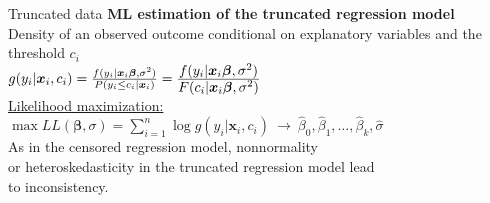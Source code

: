 \documentclass[usenames,dvipsnames]{beamer}
\newcommand{\mytikzmark}[2]{%
  \tikz[remember picture,inner sep=0pt,outer sep=0pt,baseline,anchor=base] 
    \node (#1) {\ensuremath{#2}};}
\begin{document}
\begin{frame}{Truncated data}
\textbf{ML estimation of the truncated regression model} \\
\bigskip
Density of an observed outcome conditional on explanatory variables and the threshold $c_i$ \\
\bigskip
$g(y_i|\bm{x}_i, c_i) = \frac{f(y_i|\bm{x}_i \bm{\beta}, \sigma^2)}{P(y_i \le c_i|\bm{x}_i)} = \frac{\mytikzmark{1}{f(y_i|\bm{x}_i \bm{\beta}, \sigma^2)}}{\mytikzmark{2}{F(c_i|\bm{x}_i \bm{\beta}, \sigma^2)}}$ \\
\bigskip
\underline{Likelihood maximization:} \\
\bigskip
$\max LL(\bm{\beta}, \sigma) = \sum \limits_{i=1}^{n} \log g(y_i|\bm{x}_i, c_i) \ \to \ \hat{\beta}_0, \hat{\beta}_1, \dots, \hat{\beta}_k, \hat{\sigma}$ \\
\bigskip
As in the censored regression model, nonnormality \\or heteroskedasticity in the truncated regression model lead \\to inconsistency. 
\end{frame}
\end{document}
